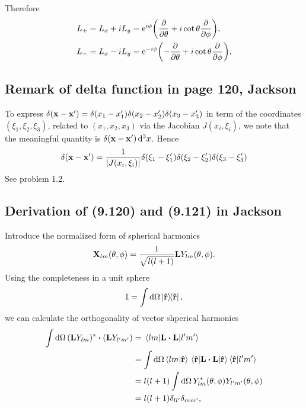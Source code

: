 \documentclass[10pt]{article}
\begin{document}
Therefore
\begin{align*}
	L_+ &= L_x + iL_y = {\mathrm{e}}^{i\phi}\qty(\pdv{\theta} + i \cot{\theta} \pdv{\phi}), \\
	L_- &= L_x - iL_y = {\mathrm{e}}^{-i\phi}\qty(-\pdv{\theta} + i \cot{\theta} \pdv{\phi}).
\end{align*}

\subsection{Remark of delta function in page 120, Jackson}

To express $\delta(\vb{x} - \vb{x'}) = \delta(x_1 - x_1')\delta(x_2 - x_2')\delta(x_3 - x_3')$ in term of the coordinates $(\xi_1, \xi_2, \xi_3)$, related to $(x_1,x_2,x_3)$ via the Jacobian $J(x_i,\xi_i)$, we note that the meaningful quantity is $\delta(\vb{x} - \vb{x'}) \dd[3]{x}$.
Hence
\begin{equation}
	\delta(\vb{x} - \vb{x'}) = \frac{1}{\abs{J(x_i,\xi_i)}} \delta(\xi_1 - \xi_1') \delta(\xi_2 - \xi_2') \delta(\xi_3 - \xi_3')
\end{equation}
See problem 1.2.

\subsection{Derivation of (9.120) and (9.121) in Jackson}

Introduce the normalized form of spherical harmonics
\begin{equation}
	\vb{X}_{lm}(\theta, \phi) = \frac{1}{\sqrt{l(l+1)}} \vb{L} Y_{lm}(\theta, \phi).
\end{equation}
Using the completeness in a unit sphere
\begin{equation}
	\mathbb{I} = \int \dd{\Omega} \dyad{\vu{r}},
\end{equation}
we can calculate the orthogonality of vector shperical harmonics
\begin{align*}
	\int \dd{\Omega} (\vb{L}Y_{lm})^* \vdot (\vb{L}Y_{l'm'})
	&= \mel{lm}{\vb{L}\vdot\vb{L}}{l'm'} \\
	&= \int \dd{\Omega} \braket{lm}{\vu{r}} \ev{\vb{L}\vdot\vb{L}}{\vu{r}} \braket{\vu{r}}{l'm'} \\
	&= l(l+1) \int \dd{\Omega} Y_{lm}^* (\theta, \phi) Y_{l'm'} (\theta, \phi) \\
	&= l(l+1) \delta_{l l'}\delta_{m m'},
\end{align*}
\end{document}
